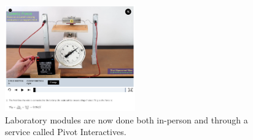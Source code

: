 \documentclass[../../../main.tex]{subfiles}
\begin{document}
\begin{figure}
\centering
\includegraphics[width=0.5\textwidth]{figures/pivot.png}
\caption{\label{fig:pivot}  Laboratory modules are now done both in-person and through a service called Pivot Interactives.}
\end{figure}
\end{document}
